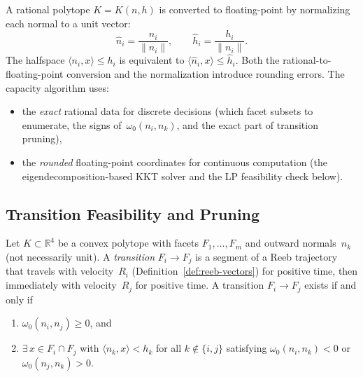 \begin{remark}%
\label{rem:v2-f64-conversion}
A rational polytope $K = K(n, h)$ is converted to
floating-point by normalizing each normal to a unit
vector:
\[
  \hat n_i = \frac{n_i}{\|n_i\|}, \qquad
  \hat h_i = \frac{h_i}{\|n_i\|}.
\]
The halfspace $\langle n_i, x \rangle \leq h_i$ is
equivalent to
$\langle \hat n_i, x \rangle \leq \hat h_i$.
Both the rational-to-floating-point conversion
and the normalization introduce rounding errors.
The capacity algorithm uses:
\begin{itemize}
\item the \emph{exact} rational data for discrete
  decisions (which facet subsets to enumerate,
  the signs of~$\omega_0(n_i, n_k)$,
  and the exact part of transition pruning),
\item the \emph{rounded} floating-point coordinates
  for continuous computation (the eigendecomposition-based
  KKT solver and the LP feasibility check below).
\end{itemize}
\end{remark}


\subsection{Transition Feasibility and Pruning}\label{app:v2-pruning}


\begin{lemma}%
\label{lem:v2-transition-feasibility}
Let $K \subset \mathbb{R}^4$ be a convex polytope with
facets $F_1, \ldots, F_m$ and outward normals~$n_k$
(not necessarily unit).
A \emph{transition} $F_i \to F_j$ is a segment of a
Reeb trajectory that travels with velocity~$R_i$
(Definition~\ref{def:reeb-vectors}) for positive time,
then immediately with velocity~$R_j$ for positive time.
A transition $F_i \to F_j$ exists if and only if
\begin{enumerate}
\item $\omega_0(n_i, n_j) \ge 0$, and
\item $\exists\, x \in F_i \cap F_j$ with
  $\langle n_k, x \rangle < h_k$
  for all $k \notin \{i,j\}$ satisfying
  $\omega_0(n_i, n_k) < 0$ or
  $\omega_0(n_j, n_k) > 0$.
\end{enumerate}
\end{lemma}

